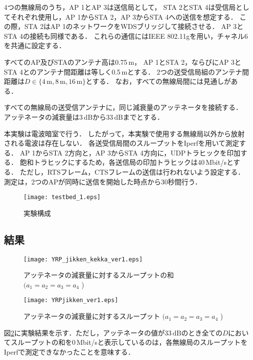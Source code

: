 \documentclass[master]{kuisthesis}		%
\begin{document}
4つの無線局のうち，AP 1とAP 3は送信局として，%
STA 2とSTA 4は受信局としてそれぞれ使用し，AP 1からSTA 2，AP 3からSTA 4への送信を想定する．
この際，STA 2はAP 1のネットワークをWDSブリッジして接続させる．
AP 3とSTA 4の接続も同様である．
これらの通信にはIEEE 802.11gを用い，チャネル6を共通に設定する．

すべてのAP及びSTAのアンテナ高は0.75\,m，
AP 1とSTA 2，ならびにAP 3とSTA 4とのアンテナ間距離は等しく0.5\,mとする．
2つの送受信局組のアンテナ間距離は$D \in \{4\,\mathrm{m}, 8\,\mathrm{m}, 16\,\mathrm{m}\}$とする．
なお，すべての無線局間には見通しがある．

すべての無線局の送受信アンテナに，同じ減衰量のアッテネータを接続する．
アッテネータの減衰量は$3\,\mathrm{dB}$から$33\,\mathrm{dB}$までとする．

本実験は電波暗室で行う．
したがって，本実験で使用する無線局以外から放射される電波は存在しない．
各送受信局間のスループットをIperfを用いて測定する．
AP 1からSTA 2方向と，AP 3からSTA 4方向に，UDPトラヒックを印加する．
飽和トラヒックにするため，各送信局の印加トラヒックは40\,Mbit/sとする．
ただし，RTSフレーム，CTSフレームの送信は行われないよう設定する．
測定は，2つのAPが同時に送信を開始した時点から30秒間行う．
\ifnum {}
\begin{figure}[!t]
\centering
\texttt{[image: testbed\_1.eps]}
\caption{実験構成}
\label{testbed}
\end{figure}
\fi

\subsection{結果}
\ifnum {}
\begin{figure}[!t]
\centering
\texttt{[image: YRP\_jikken\_kekka\_ver1.eps]}
\caption{アッテネータの減衰量に対するスループットの和   \newline $(a_1=a_2=a_3=a_4$ )}
\label{YRP_jikken_kekka}
\end{figure}
\fi
\ifnum {}
\begin{figure}[!t]
\centering
\texttt{[image: YRPjikken\_ver1.eps]}
\caption{アッテネータの減衰量に対するスループット   \newline $(a_1=a_2=a_3=a_4$ )}
\label{YRPjikken}
\end{figure}
\fi
図\ref{YRP_jikken_kekka}に実験結果を示す．ただし，アッテネータの値が$33\,\mathrm{dB}$のとき全ての$D$においてスループットの和を0\,Mbit/sと表示しているのは，各無線局のスループットをIperfで測定できなかったことを意味する．
\end{document}
